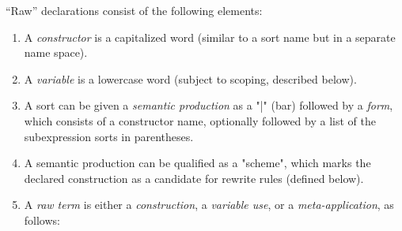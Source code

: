 \documentclass[11pt]{article} %
\begin{document}
\begin{manual}\label{man:raw}
  ``Raw'' declarations consist of the following elements:
  \begin{enumerate}

  \item A \emph{constructor} is a capitalized word (similar to a sort name but in a separate name
    space).

  \item A \emph{variable} is a lowercase word (subject to scoping, described below).

  \item A sort can be given a \emph{semantic production} as a "|" (bar) followed by a \emph{form},
    which consists of a constructor name, optionally followed by a list of the subexpression sorts
    in parentheses.


  \item A semantic production can be qualified as a "scheme", which marks the declared construction
    as a candidate for rewrite rules (defined below).

  \item A \emph{raw term} is either a \emph{construction}, a \emph{variable use}, or a
    \emph{meta-application}, as follows:
    \begin{enumerate}


\end{enumerate}
\end{enumerate}
\end{manual}
\end{document}

